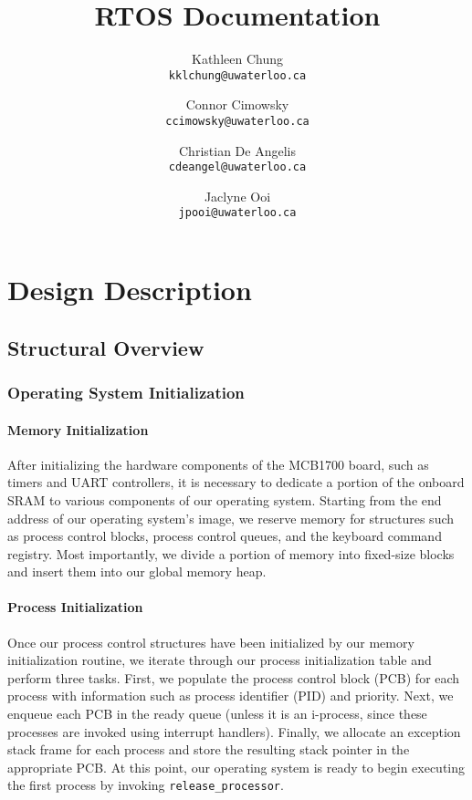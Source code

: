 \documentclass[12pt]{report}
\begin{document}
\title{RTOS Documentation}

\author{
    Kathleen Chung\\
    \texttt{kklchung@uwaterloo.ca}
    \and
    Connor Cimowsky\\
    \texttt{ccimowsky@uwaterloo.ca}
    \and
    Christian De Angelis\\
    \texttt{cdeangel@uwaterloo.ca}
    \and
    Jaclyne Ooi\\
    \texttt{jpooi@uwaterloo.ca}
}

\maketitle

\tableofcontents

\listofalgorithms

\part{Design Description}

\chapter{Structural Overview}

\section{Operating System Initialization}

\subsection{Memory Initialization}

After initializing the hardware components of the MCB1700 board, such as timers and UART controllers, it is necessary to dedicate a portion of the onboard SRAM to various components of our operating system. Starting from the end address of our operating system's image, we reserve memory for structures such as process control blocks, process control queues, and the keyboard command registry. Most importantly, we divide a portion of memory into fixed-size blocks and insert them into our global memory heap.

\subsection{Process Initialization}

Once our process control structures have been initialized by our memory initialization routine, we iterate through our process initialization table and perform three tasks. First, we populate the process control block (PCB) for each process with information such as process identifier (PID) and priority. Next, we enqueue each PCB in the ready queue (unless it is an i-process, since these processes are invoked using interrupt handlers). Finally, we allocate an exception stack frame for each process and store the resulting stack pointer in the appropriate PCB. At this point, our operating system is ready to begin executing the first process by invoking \texttt{release_processor}.
\end{document}

